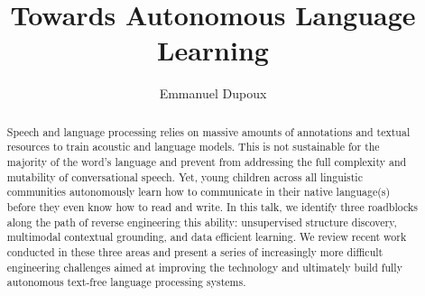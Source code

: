 \documentclass{article}
\title{Towards Autonomous Language Learning}
\author{Emmanuel Dupoux}
\date{}
\begin{document}
\maketitle
\thispagestyle{empty}
\begin{abstract}
Speech and language processing relies on massive amounts of annotations and textual resources to train acoustic and language models. This is not sustainable for the majority of the word's language and prevent from addressing the full complexity and mutability of conversational speech. Yet, young children across all linguistic communities autonomously learn how to communicate in their native language(s) before they even know how to read and write. In this talk, we identify three roadblocks along the path of reverse engineering this ability: unsupervised structure discovery, multimodal contextual grounding, and data efficient learning. We review recent work conducted in these three areas and present a series of increasingly more difficult engineering challenges aimed at improving the technology and ultimately build fully autonomous text-free language processing systems.
\end{abstract}
\end{document}
